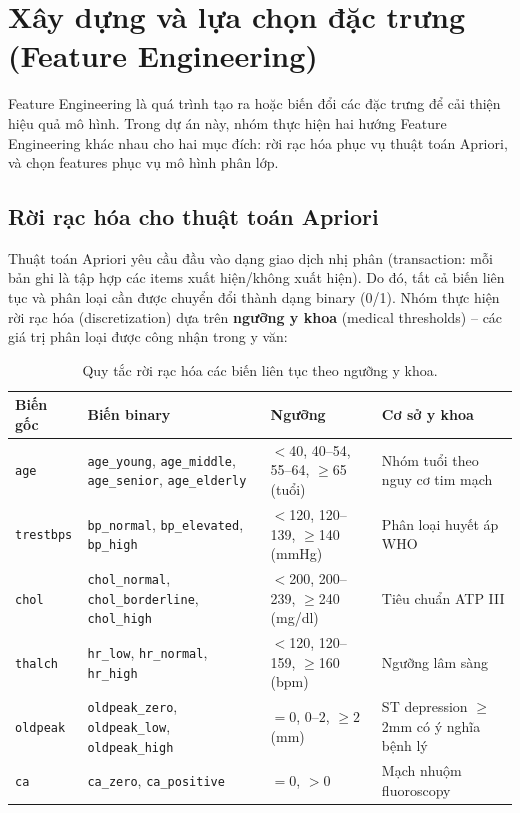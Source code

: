 \section{Xây dựng và lựa chọn đặc trưng (Feature Engineering)}

Feature Engineering là quá trình tạo ra hoặc biến đổi các đặc trưng để cải thiện hiệu quả mô hình. Trong dự án này, nhóm thực hiện hai hướng Feature Engineering khác nhau cho hai mục đích: rời rạc hóa phục vụ thuật toán Apriori, và chọn features phục vụ mô hình phân lớp.

\subsection{Rời rạc hóa cho thuật toán Apriori}

Thuật toán Apriori yêu cầu đầu vào dạng giao dịch nhị phân (transaction: mỗi bản ghi là tập hợp các items xuất hiện/không xuất hiện). Do đó, tất cả biến liên tục và phân loại cần được chuyển đổi thành dạng binary (0/1). Nhóm thực hiện rời rạc hóa (discretization) dựa trên \textbf{ngưỡng y khoa} (medical thresholds) -- các giá trị phân loại được công nhận trong y văn:

\begin{table}[H]
\centering
\caption{Quy tắc rời rạc hóa các biến liên tục theo ngưỡng y khoa.}
\label{tab:discretization}
\small
\begin{tabular}{|l|l|p{4.5cm}|p{3cm}|}
\hline
\textbf{Biến gốc} & \textbf{Biến binary} & \textbf{Ngưỡng} & \textbf{Cơ sở y khoa} \\ \hline
\texttt{age} & \texttt{age\_young}, \texttt{age\_middle}, \texttt{age\_senior}, \texttt{age\_elderly} & $<$40, 40--54, 55--64, $\geq$65 (tuổi) & Nhóm tuổi theo nguy cơ tim mạch \\ \hline
\texttt{trestbps} & \texttt{bp\_normal}, \texttt{bp\_elevated}, \texttt{bp\_high} & $<$120, 120--139, $\geq$140 (mmHg) & Phân loại huyết áp WHO \\ \hline
\texttt{chol} & \texttt{chol\_normal}, \texttt{chol\_borderline}, \texttt{chol\_high} & $<$200, 200--239, $\geq$240 (mg/dl) & Tiêu chuẩn ATP III \\ \hline
\texttt{thalch} & \texttt{hr\_low}, \texttt{hr\_normal}, \texttt{hr\_high} & $<$120, 120--159, $\geq$160 (bpm) & Ngưỡng lâm sàng \\ \hline
\texttt{oldpeak} & \texttt{oldpeak\_zero}, \texttt{oldpeak\_low}, \texttt{oldpeak\_high} & $=0$, $0$--$2$, $\geq 2$ (mm) & ST depression $\geq$2mm có ý nghĩa bệnh lý \\ \hline
\texttt{ca} & \texttt{ca\_zero}, \texttt{ca\_positive} & $= 0$, $> 0$ & Mạch nhuộm fluoroscopy \\ \hline
\end{tabular}
\end{table}

